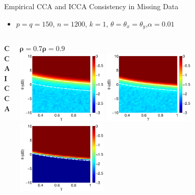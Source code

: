 \documentclass[8pt]{beamer}
\begin{document}
\begin{frame}{Empirical CCA and ICCA Consistency in Missing Data}

  \begin{itemize}
  \item $p=q=150$, $n=1200$, $k=1$, $\theta=\theta_x=\theta_y$,$\alpha=0.01$
  \end{itemize}

  \begin{columns}[T]
    \begin{column}{0.01\textwidth}
      \vspace{15ex}
      \textbf{ CCA}\\
      \vspace{20ex}
      \textbf{ICCA}
    \end{column}
    \begin{column}{1\textwidth}
      \begin{center}
        $\boldsymbol{\rho=}\mathbf{0.7}$\hspace{22ex}$\boldsymbol{\rho=0.9}$\\[0.5ex]
        \includegraphics[width=0.35\textwidth]{figures/cca_missing_7_1200.pdf}\hspace{2ex}
        \includegraphics[width=0.35\textwidth]{figures/cca_missing_9_1200.pdf}\\[2ex]
        \includegraphics[width=0.35\textwidth]{figures/icca_missing_7_1200.pdf}\hspace{2ex}

\end{center}
\end{column}
\end{columns}
\end{frame}
\end{document}

